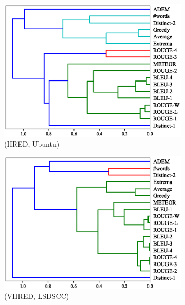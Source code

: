 \begin{figure}[htb]
\begin{subfigure}{0.40\linewidth}
        \includegraphics[width=\linewidth]{figure/plot/hierarchy/v2/pearson/hred/ubuntu/plot.eps}
        \caption{(HRED, Ubuntu)}
    \end{subfigure}
    \begin{subfigure}{0.40\linewidth}
        \centering
        \includegraphics[width=\linewidth]{figure/plot/hierarchy/v2/pearson/vhred/lsdscc/plot.eps}
        \caption{(VHRED, LSDSCC)}
    \end{subfigure}%
    \begin{subfigure}{0.40\linewidth}
        \centering

\end{subfigure}
\end{figure}
